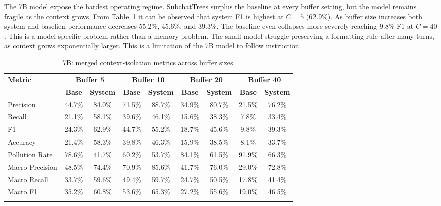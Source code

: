 \documentclass[pdflatex,sn-mathphys-num]{sn-jnl}%
\theoremstyle{thmstyleone}%
\theoremstyle{thmstyletwo}%
\theoremstyle{thmstylethree}%
\begin{document}
The 7B model expose the hardest operating regime. SubchatTrees surplus the baseline at every buffer setting, but the model remains fragile as the context grows. From Table~\ref{tab:7b_context_main} it can be observed that system F1 is highest at $C=5$ (62.9\%). As buffer size increases both system and baselien performance decreases 55.2\%, 45.6\%, and 39.3\%. The baseline even collapses more severely reaching 9.8\% F1 at $C=40$. This is a model specific problem rather than a memory problem. The small model struggle preserving a formatting rule after many turns, as context grows exponentially larger. This is a limitation of the 7B model to follow instruction.




\begin{table}[htbp]
\caption{7B: merged context-isolation metrics across buffer sizes.}\label{tab:7b_context_main}
\centering
\scriptsize
\setlength{\tabcolsep}{3pt}
\begin{adjustbox}{width=\textwidth}
\begin{tabular}{lcccccccc}
\toprule
\textbf{Metric} & \multicolumn{2}{c}{\textbf{Buffer 5}} & \multicolumn{2}{c}{\textbf{Buffer 10}} & \multicolumn{2}{c}{\textbf{Buffer 20}} & \multicolumn{2}{c}{\textbf{Buffer 40}} \\
\cmidrule(lr){2-3}\cmidrule(lr){4-5}\cmidrule(lr){6-7}\cmidrule(lr){8-9}
 & \textbf{Base} & \textbf{System} & \textbf{Base} & \textbf{System} & \textbf{Base} & \textbf{System} & \textbf{Base} & \textbf{System} \\
\midrule
Precision & 44.7\% & 84.0\% & 71.5\% & 88.7\% & 34.9\% & 80.7\% & 21.5\% & 76.2\% \\
Recall & 21.1\% & 58.1\% & 39.6\% & 46.1\% & 15.6\% & 38.3\% & 7.8\% & 33.4\% \\
F1 & 24.3\% & 62.9\% & 44.7\% & 55.2\% & 18.7\% & 45.6\% & 9.8\% & 39.3\% \\
Accuracy & 21.4\% & 58.3\% & 39.8\% & 46.3\% & 15.9\% & 38.5\% & 8.1\% & 33.7\% \\
Pollution Rate & 78.6\% & 41.7\% & 60.2\% & 53.7\% & 84.1\% & 61.5\% & 91.9\% & 66.3\% \\
Macro Precision & 48.5\% & 74.4\% & 70.9\% & 85.6\% & 41.7\% & 76.0\% & 29.0\% & 72.8\% \\
Macro Recall & 33.7\% & 59.6\% & 49.4\% & 59.7\% & 24.7\% & 50.5\% & 17.8\% & 41.4\% \\
Macro F1 & 35.2\% & 60.8\% & 53.6\% & 65.3\% & 27.2\% & 55.6\% & 19.0\% & 46.5\% \\
\botrule
\end{tabular}
\end{adjustbox}
\end{table}
\end{document}
